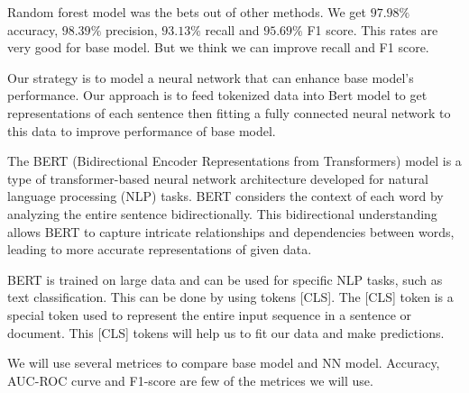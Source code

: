 \documentclass[conference]{IEEEtran}
\begin{document}
Random forest model was the bets out of other methods. We get $97.98\%$ accuracy, $98.39\%$ precision, $93.13\%$ recall and $95.69\%$ F1 score. This rates are very good for base model. But we think we can improve recall and F1 score.





Our strategy is to model a neural network that can enhance base model's performance. Our approach is to feed tokenized data into Bert model to get representations of each sentence then fitting a fully connected neural network to this data to improve performance of base model. 

The BERT (Bidirectional Encoder Representations from Transformers) model is a type of transformer-based neural network architecture developed for natural language processing (NLP) tasks. BERT considers the context of each word by analyzing the entire sentence bidirectionally. This bidirectional understanding allows BERT to capture intricate relationships and dependencies between words, leading to more accurate representations of given data.

BERT is trained on large data and can be used for specific NLP tasks, such as text classification. This can be done by using tokens [CLS]. The [CLS] token is a special token used to represent the entire input sequence in a sentence or document. This [CLS] tokens will help us to fit our data and make predictions.

We will use several metrices to compare base model and NN model. Accuracy, AUC-ROC curve and F1-score are few of the metrices we will use.
\end{document}
